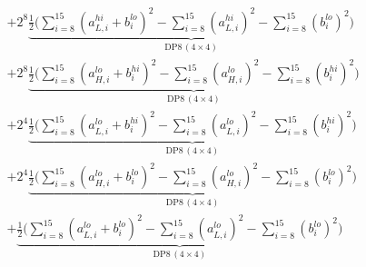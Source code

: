 \documentclass[fleqn]{article}
\newcommand{\DPop}[3]{\mathrm{DP#1}\,(#2\!\times\!#3)}
\begin{document}
\begin{align*}
  & + 2^{8}\underbrace{\tfrac{1}{2}\Big(\sum_{i=8}^{15}(a_{L,i}^{hi}{+}b_i^{lo})^2 - \sum_{i=8}^{15}(a_{L,i}^{hi})^2 - \sum_{i=8}^{15}(b_i^{lo})^2\Big)}_{\DPop{8}{4}{4}} \\[0.5em]
  & + 2^{8}\underbrace{\tfrac{1}{2}\Big(\sum_{i=8}^{15}(a_{H,i}^{lo}{+}b_i^{hi})^2 - \sum_{i=8}^{15}(a_{H,i}^{lo})^2 - \sum_{i=8}^{15}(b_i^{hi})^2\Big)}_{\DPop{8}{4}{4}} \\[0.5em]
  & + 2^{4}\underbrace{\tfrac{1}{2}\Big(\sum_{i=8}^{15}(a_{L,i}^{lo}{+}b_i^{hi})^2 - \sum_{i=8}^{15}(a_{L,i}^{lo})^2 - \sum_{i=8}^{15}(b_i^{hi})^2\Big)}_{\DPop{8}{4}{4}} \\[0.5em]
  & + 2^{4}\underbrace{\tfrac{1}{2}\Big(\sum_{i=8}^{15}(a_{H,i}^{lo}{+}b_i^{lo})^2 - \sum_{i=8}^{15}(a_{H,i}^{lo})^2 - \sum_{i=8}^{15}(b_i^{lo})^2\Big)}_{\DPop{8}{4}{4}} \\[0.5em]
  & + \underbrace{\tfrac{1}{2}\Big(\sum_{i=8}^{15}(a_{L,i}^{lo}{+}b_i^{lo})^2 - \sum_{i=8}^{15}(a_{L,i}^{lo})^2 - \sum_{i=8}^{15}(b_i^{lo})^2\Big)}_{\DPop{8}{4}{4}}
\end{align*}
\end{document}
